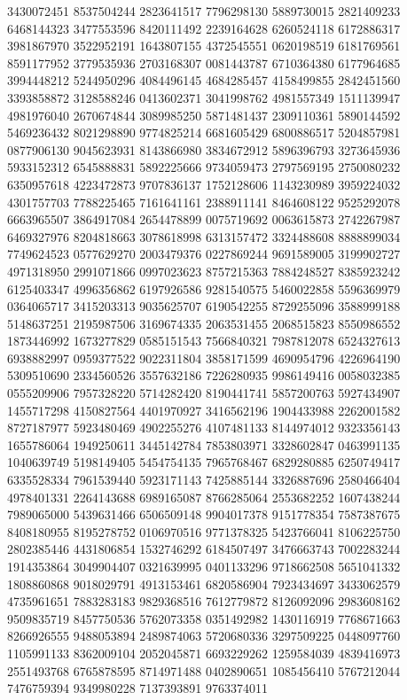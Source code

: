 {{3430072451 8537504244 2823641517 7796298130 5889730015 2821409233 6468144323
3477553596 8420111492 2239164628 6260524118 6172886317 3981867970 3522952191
1643807155 4372545551 0620198519 6181769561 8591177952 3779535936 2703168307
0081443787 6710364380 6177964685 3994448212 5244950296 4084496145 4684285457
4158499855 2842451560 3393858872 3128588246 0413602371 3041998762 4981557349
1511139947 4981976040 2670674844 3089985250 5871481437 2309110361 5890144592
5469236432 8021298890 9774825214 6681605429 6800886517 5204857981 0877906130
9045623931 8143866980 3834672912 5896396793 3273645936 5933152312 6545888831
5892225666 9734059473 2797569195 2750080232 6350957618 4223472873 9707836137
1752128606 1143230989 3959224032 4301757703 7788225465 7161641161 2388911141
8464608122 9525292078 6663965507 3864917084 2654478899 0075719692 0063615873
2742267987 6469327976 8204818663 3078618998 6313157472 3324488608 8888899034
7749624523 0577629270 2003479376 0227869244 9691589005 3199902727 4971318950
2991071866 0997023623 8757215363 7884248527 8385923242 6125403347 4996356862
6197926586 9281540575 5460022858 5596369979 0364065717 3415203313 9035625707
6190542255 8729255096 3588999188 5148637251 2195987506 3169674335 2063531455
2068515823 8550986552 1873446992 1673277829 0585151543 7566840321 7987812078
6524327613 6938882997 0959377522 9022311804 3858171599 4690954796 4226964190
5309510690 2334560526 3557632186 7226280935 9986149416 0058032385 0555209906
7957328220 5714282420 8190441741 5857200763 5927434907 1455717298 4150827564
4401970927 3416562196 1904433988 2262001582 8727187977 5923480469 4902255276
4107481133 8144974012 9323356143 1655786064 1949250611 3445142784 7853803971
3328602847 0463991135 1040639749 5198149405 5454754135 7965768467 6829280885
6250749417 6335528334 7961539440 5923171143 7425885144 3326887696 2580466404
4978401331 2264143688 6989165087 8766285064 2553682252 1607438244 7989065000
5439631466 6506509148 9904017378 9151778354 7587387675 8408180955 8195278752
0106970516 9771378325 5423766041 8106225750 2802385446 4431806854 1532746292
6184507497 3476663743 7002283244 1914353864 3049904407 0321639995 0401133296
9718662508 5651041332 1808860868 9018029791 4913153461 6820586904 7923434697
3433062579 4735961651 7883283183 9829368516 7612779872 8126092096 2983608162
9509835719 8457750536 5762073358 0351492982 1430116919 7768671663 8266926555
9488053894 2489874063 5720680336 3297509225 0448097760 1105991133 8362009104
2052045871 6693229262 1259584039 4839416973 2551493768 6765878595 8714971488
0402890651 1085456410 5767212044 7476759394 9349980228 7137393891 9763374011
}}
